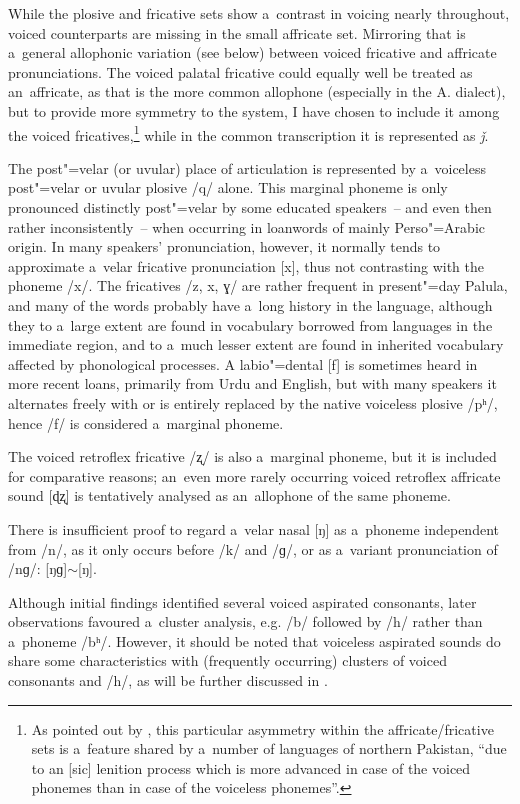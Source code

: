 While the plosive and fricative sets show a~contrast in voicing nearly throughout, voiced counterparts are missing in the small affricate set. Mirroring that is a~general allophonic variation (see below) between voiced fricative and affricate pronunciations. The voiced palatal fricative could equally well be treated as an~affricate, as that is the more common allophone (especially in the A. dialect), but to provide more symmetry to the system, I have chosen to include it among the voiced fricatives,\footnote{As pointed out by \citet[34]{zoller2005}, this particular asymmetry within the affricate/fricative sets is a~feature shared by a~number of languages of northern Pakistan, ``due to an [sic] lenition process which is more advanced in case of the voiced phonemes than in case of the voiceless phonemes''.} while in the common transcription it is represented as \textit{ǰ}.


The post"=velar (or uvular) place of articulation is represented by a~voiceless post"=velar or uvular plosive /q/ alone. This marginal phoneme is only pronounced distinctly post"=velar by some educated speakers~-- and even then rather inconsistently~-- when occurring in loanwords of mainly Perso"=Arabic origin. In many speakers' pronunciation, however, it normally tends to approximate a~velar fricative pronunciation [x], thus not contrasting with the phoneme /x/. The fricatives /z, x, ɣ/ are rather frequent in present"=day Palula, and many of the words probably have a~long history in the language, although they to a~large extent are found in vocabulary borrowed from languages in the immediate region, and to a~much lesser extent are found in inherited vocabulary affected by phonological processes. A labio"=dental [f] is sometimes heard in more recent loans, primarily from Urdu and English, but with many speakers it alternates freely with or is entirely replaced by the native voiceless plosive /pʰ/, hence /f/ is considered a~marginal phoneme. 


The voiced retroflex fricative /ʐ/ is also a~marginal phoneme, but it is included for comparative reasons; an~even more rarely occurring voiced retroflex affricate sound [ɖʐ] is tentatively analysed as an~allophone of the same phoneme. 


There is insufficient proof to regard a~velar nasal [ŋ] as a~phoneme independent from /n/, as it only occurs before /k/ and /ɡ/, or as a~variant pronunciation of /nɡ/: [ŋɡ]$\sim$[ŋ]. 


Although initial findings identified several voiced aspirated consonants, later observations favoured a~cluster analysis, e.g. /b/ followed by /h/ rather than a~phoneme /bʰ/. However, it should be noted that voiceless aspirated sounds do share some characteristics with (frequently occurring) clusters of voiced consonants and /h/, as will be further discussed in .

